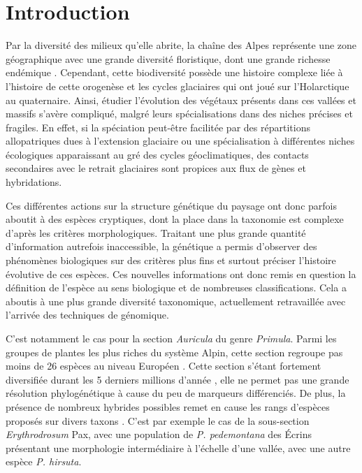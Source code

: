 \section{Introduction}

Par la diversité des milieux qu'elle abrite, la chaîne des Alpes représente une zone géographique avec une grande diversité floristique, dont une grande richesse endémique \citep{Ozenda1995}. Cependant, cette biodiversité possède une histoire complexe liée à l'histoire de cette orogenèse et les cycles glaciaires qui ont joué sur l'Holarctique au quaternaire. Ainsi, étudier l'évolution des végétaux présents dans ces vallées et massifs s'avère compliqué, malgré leurs spécialisations dans des niches précises et fragiles. En effet, si la spéciation peut-être facilitée par des répartitions allopatriques dues à l’extension glaciaire ou une spécialisation à différentes niches écologiques apparaissant au gré des cycles géoclimatiques, des contacts secondaires avec le retrait glaciaires sont propices aux flux de gènes et hybridations. 

Ces différentes actions sur la structure génétique du paysage ont donc parfois aboutit à des espèces cryptiques, dont la place dans la taxonomie est complexe d'après les critères morphologiques. Traitant une plus grande quantité d'information autrefois inaccessible, la génétique a permis d'observer des phénomènes biologiques sur des critères plus fins et surtout préciser l'histoire évolutive de ces espèces. Ces nouvelles informations ont donc remis en question la définition de l'espèce au sens biologique et de nombreuses classifications. Cela a aboutis à une plus grande diversité taxonomique, actuellement retravaillée avec l'arrivée des techniques de génomique.  

C'est notamment le cas pour la section \textit{Auricula} du genre \textit{Primula}. Parmi les groupes de plantes les plus riches du système Alpin, cette section regroupe pas moins de 26 espèces au niveau Européen \citep{Zhang2004}. Cette section s'étant fortement diversifiée durant les 5 derniers millions d'année \citep{Zhang2004a}, elle ne permet pas une grande résolution phylogénétique à cause du peu de marqueurs différenciés. De plus, la présence de nombreux hybrides possibles remet en cause les rangs d'espèces proposés sur divers taxons \citep{Kadereit2011}. C'est par exemple le cas de la sous-section \textit{Erythrodrosum} Pax, avec une population de \textit{P. pedemontana} des Écrins présentant une morphologie intermédiaire à l'échelle d'une vallée, avec une autre espèce \textit{P. hirsuta}.

